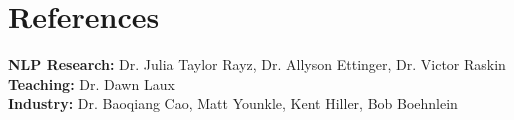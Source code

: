\documentclass[11pt]{article}
\begin{document}
\section*{References}
\textbf{NLP Research:} Dr. Julia Taylor Rayz, Dr. Allyson Ettinger, Dr. Victor Raskin\\
\textbf{Teaching:} Dr. Dawn Laux\\
\textbf{Industry:} Dr. Baoqiang Cao, Matt Younkle, Kent Hiller, Bob Boehnlein



\end{document}
